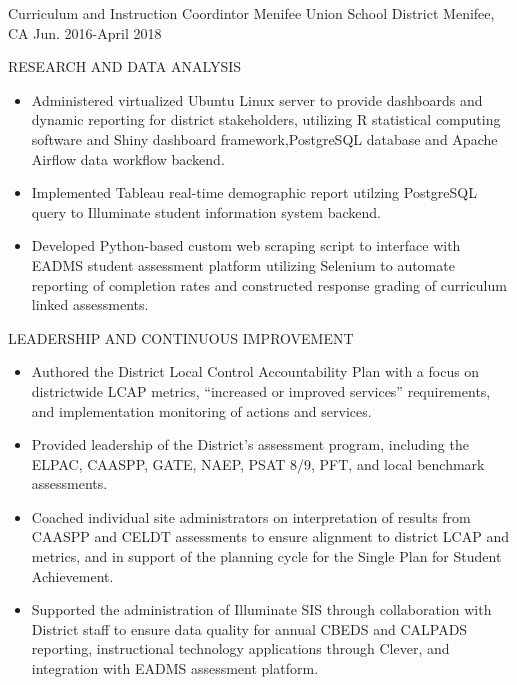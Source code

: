\begin{cventries}
  \cventry
    {Curriculum and Instruction Coordintor} %
    {Menifee Union School District} %
    {Menifee, CA} %
    {Jun. 2016-April 2018} %
    {
      \begin{cvitems} %
          \item RESEARCH AND DATA ANALYSIS
          \begin{itemize}
            \item {Administered virtualized Ubuntu Linux server to provide dashboards
            and dynamic reporting for district stakeholders, utilizing R statistical
            computing software and Shiny dashboard framework,PostgreSQL database and
            Apache Airflow data workflow backend.}
            \item {Implemented Tableau real-time demographic report utilzing PostgreSQL
            query to Illuminate student information system backend.}
            \item {Developed Python-based custom web scraping script to interface
            with EADMS student assessment platform utilizing Selenium to automate
            reporting of completion rates and constructed response grading of
            curriculum linked assessments.}
          \end{itemize}
          \item LEADERSHIP AND CONTINUOUS IMPROVEMENT
          \begin{itemize}
            \item {Authored the District Local Control Accountability Plan with a
            focus on districtwide LCAP metrics, “increased or improved services”
            requirements, and implementation monitoring of actions and services.}
            \item {Provided leadership of the District’s assessment program,
            including the ELPAC, CAASPP, GATE, NAEP, PSAT 8/9, PFT, and local
            benchmark assessments.}
            \item {Coached individual site administrators on interpretation of
            results from CAASPP and CELDT assessments to ensure alignment to district
            LCAP and metrics, and in support of the planning cycle for the Single
            Plan for Student Achievement.}
            \item {Supported the administration of Illuminate SIS through
            collaboration with District staff to ensure data quality for annual CBEDS
            and CALPADS reporting, instructional technology applications through
            Clever, and integration with EADMS assessment platform.}
          \end{itemize}
      \end{cvitems}
    }



\end{cventries}
